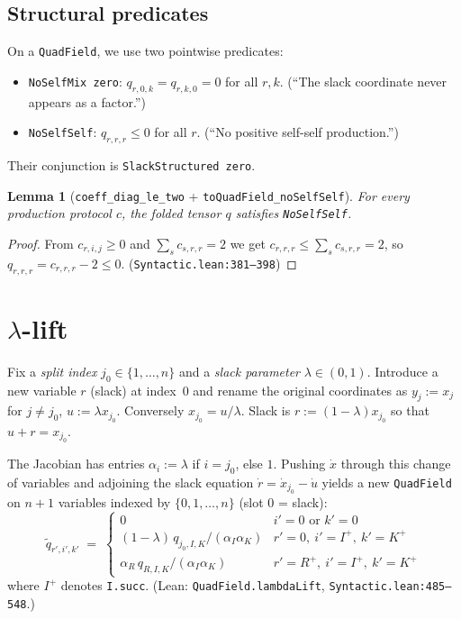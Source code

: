 \documentclass[11pt]{article}
\newtheorem{lemma}[theorem]{Lemma}
\newcommand{\slack}{0}
\begin{document}
\subsection{Structural predicates}
On a \verb|QuadField|, we use two pointwise predicates:
\begin{itemize}
  \item \verb|NoSelfMix zero|: $q_{r,\slack,k} = q_{r,k,\slack} = 0$ for
    all $r, k$. (``The slack coordinate never appears as a factor.'')
  \item \verb|NoSelfSelf|: $q_{r,r,r} \le 0$ for all $r$.
    (``No positive self-self production.'')
\end{itemize}
Their conjunction is \verb|SlackStructured zero|.

\begin{lemma}[\texttt{coeff\_diag\_le\_two} + \texttt{toQuadField\_noSelfSelf}]
\label{lem:auto-noselfself}
For every production protocol $c$, the folded tensor $q$ satisfies
\verb|NoSelfSelf|.
\end{lemma}
\begin{proof}
From $c_{r,i,j} \ge 0$ and $\sum_s c_{s,r,r} = 2$ we get
$c_{r,r,r} \le \sum_s c_{s,r,r} = 2$, so
$q_{r,r,r} = c_{r,r,r} - 2 \le 0$.
\hfill(\texttt{Syntactic.lean:381--398})
\end{proof}

\section{$\lambda$-lift}

Fix a \emph{split index} $j_0 \in \{1, \dots, n\}$ and a \emph{slack
parameter} $\lambda \in (0, 1)$. Introduce a new variable $r$ (slack) at
index~$0$ and rename the original coordinates as $y_j := x_j$ for $j \ne j_0$,
$u := \lambda x_{j_0}$. Conversely $x_{j_0} = u/\lambda$. Slack is
$r := (1-\lambda) x_{j_0}$ so that $u + r = x_{j_0}$.

The Jacobian has entries $\alpha_i := \lambda$ if $i = j_0$, else $1$.
Pushing $\dot x$ through this change of variables and adjoining the slack
equation $\dot r = \dot x_{j_0} - \dot u$ yields a new \verb|QuadField|
on $n+1$ variables indexed by $\{0, 1, \dots, n\}$ (slot $0$ = slack):
\begin{equation}
    \widetilde q_{r',i',k'} \;=\;
        \begin{cases}
          0 & i' = \slack \text{ or } k' = \slack \\
          (1-\lambda) \, q_{j_0, I, K} / (\alpha_I \alpha_K) & r' = \slack,\ i' = I^+,\ k' = K^+ \\
          \alpha_R \, q_{R, I, K} / (\alpha_I \alpha_K) & r' = R^+,\ i' = I^+,\ k' = K^+
        \end{cases}
    \tag{$\Lambda$}
\end{equation}
where $I^+$ denotes \texttt{I.succ}. (Lean: \verb|QuadField.lambdaLift|,
\texttt{Syntactic.lean:485--548}.)
\end{document}
